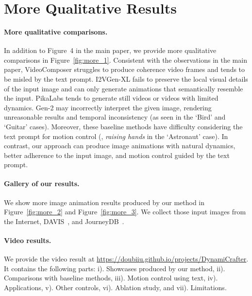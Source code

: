 \section{More Qualitative Results}
\label{sec:more}
\paragraph{More qualitative comparisons.}
In addition to Figure~4 in the main paper, we provide more qualitative comparisons in Figure~\ref{fig:more_1}. Consistent with the observations in the main paper, VideoComposer struggles to produce coherence video frames and tends to be misled by the text prompt. I2VGen-XL fails to preserve the local visual details of the input image and can only generate animations that semantically resemble the input. PikaLabs tends to generate still videos or videos with limited dynamics. Gen-2 may incorrectly interpret the given image, rendering unreasonable results and temporal inconsistency (as seen in the `Bird' and `Guitar' cases). Moreover, these baseline methods have difficulty considering the text prompt for motion control (\eg, \emph{raising hands} in the `Astronaut' case). In contrast, our approach can produce image animations with natural dynamics, better adherence to the input image, and motion control guided by the text prompt.

\paragraph{Gallery of our results.} We show more image animation results produced by our method in Figure~\ref{fig:more_2} and Figure~\ref{fig:more_3}. We collect those input images from the Internet, DAVIS~\cite{davis}, and JourneyDB~\cite{pan2023journeydb}.

\paragraph{Video results.}
We provide the video result at \url{https://doubiiu.github.io/projects/DynamiCrafter}. It contains the following parts: i). Showcases produced by our method, ii). Comparisons with baseline methods, iii). Motion control using text, iv). Applications, v). Other controls, vi). Ablation study, and vii). Limitations.







